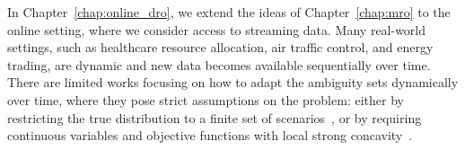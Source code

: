 In Chapter~\ref{chap:online_dro}, we extend the ideas of Chapter~\ref{chap:mro} to the online setting, where we consider access to streaming data. 
Many real-world settings, such as healthcare resource allocation, air traffic control, and energy trading, are dynamic and new data becomes available sequentially over time.
There are limited works focusing on how to adapt the ambiguity sets dynamically over time, where they pose strict assumptions on the problem: either by restricting the true distribution to a finite set of scenarios~\cite{drotime}, or by requiring continuous variables and objective functions with local strong concavity~\cite{assim}.
